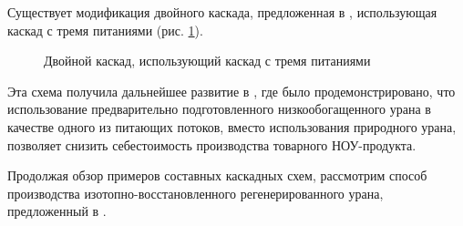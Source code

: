 Существует модификация двойного каскада, предложенная в \cite{smirnovDilutionRecycledUranium2015}, использующая каскад с тремя питаниями  (рис. \ref{fig:double_3feeds}).
\begin{figure}[ht]
  \caption{Двойной каскад, использующий каскад с тремя питаниями}\label{fig:double_3feeds}
\end{figure}

Эта схема получила дальнейшее развитие в \cite{smirnovEvaluatingEffectivenessDilution2016}, где было продемонстрировано, что использование предварительно подготовленного низкообогащенного урана в качестве одного из питающих потоков, вместо использования природного урана, позволяет снизить себестоимость производства товарного НОУ-продукта.

Продолжая обзор примеров составных каскадных схем, рассмотрим способ производства изотопно-восстановленного регенерированного урана, предложенный в \cite{SposobIzotopnogoVosstanovleniyac}.

